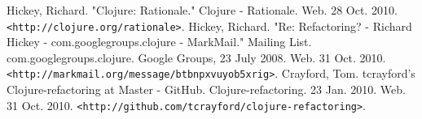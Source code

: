\documentclass{article}
\begin{document}
\begin{thebibliography}{9}
 Hickey, Richard. "Clojure: Rationale." Clojure - Rationale. Web. 28 Oct. 2010. \verb!<http://clojure.org/rationale>!.
 Hickey, Richard. "Re: Refactoring? - Richard Hickey - com.googlegroups.clojure - MarkMail." Mailing List. com.googlegroups.clojure. Google Groups, 23 July 2008. Web. 31 Oct. 2010. \verb!<http://markmail.org/message/btbnpxvuyob5xrig>!.
 Crayford, Tom. tcrayford's Clojure-refactoring at Master - GitHub. Clojure-refactoring. 23 Jan. 2010. Web. 31 Oct. 2010. \verb!<http://github.com/tcrayford/clojure-refactoring>!.
\end{thebibliography}
\end{document}
